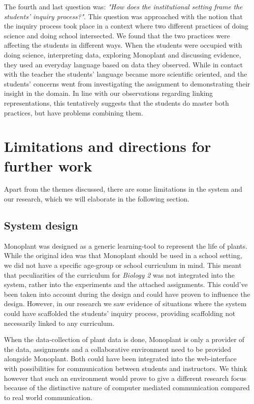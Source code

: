 The fourth and last question was: \emph{"How does the institutional setting frame the students' inquiry process?"}. This question was approached with the notion that the inquiry process took place in a context where two different practices of doing science and doing school intersected. We found that the two practices were affecting the students in different ways. When the students were occupied with doing science, interpreting data, exploring Monoplant and discussing evidence, they used an everyday language based on data they observed. While in contact with the teacher the students' language became more scientific oriented, and the students' concerns went from investigating the assignment to demonstrating their insight in the domain. In line with our observations regarding linking representations, this tentatively suggests that the students do master both practices, but have problems combining them.

\section{Limitations and directions for further work}
Apart from the themes discussed, there are some limitations in the system and our research, which we will elaborate in the following section. 

\subsection{System design}
Monoplant was designed as a generic learning-tool to represent the life of plants. While the original idea was that Monoplant should be used in a school setting, we did not have a specific age-group or school curriculum in mind. This meant that peculiarities of the curriculum for \emph{Biology 2} was not integrated into the system, rather into the experiments and the attached assignments. This could've been taken into account during the design and could have proven to influence the design. However, in our research we saw evidence of situations where the system could have scaffolded the students' inquiry process, providing scaffolding not necessarily linked to any curriculum.

When the data-collection of plant data is done, Monoplant is only a provider of the data, assignments and a collaborative environment need to be provided alongside Monoplant. Both could have been integrated into the web-interface with possibilities for communication between students and instructors. We think however that such an environment would prove to give a different research focus because of the distinctive nature of computer mediated communication compared to real world communication.

